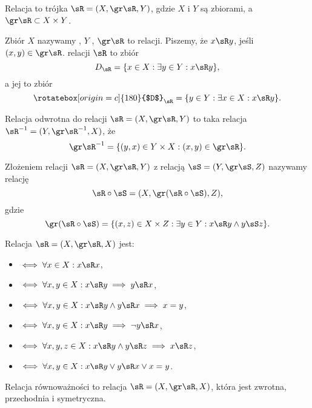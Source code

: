 \begin{definition}
    Relacja to trójka $\sR = (X, \gr\sR, Y)$, gdzie $X$ i $Y$ są zbiorami, a $\gr \sR \subset X \times Y$.
\end{definition}

Zbiór $X$ nazywamy , $Y$ , $\gr \sR$ to  relacji. Piszemy, że $x \sR y$, jeśli $(x, y) \in \gr\sR$.  relacji $\sR$ to zbiór
$$ D_\sR = \{x \in X : \exists y \in Y : x \sR y\}, $$
a jej  to zbiór
$$ \rotatebox[origin=c]{180}{$D$}_\sR = \{y \in Y : \exists x \in X : x \sR y\}. $$

\begin{definition}
    Relacja odwrotna do relacji $\sR = (X, \gr\sR, Y)$ to taka relacja $\sR^{-1} = (Y, \gr\sR^{-1}, X)$, że
    $$ \gr \sR^{-1} = \{(y, x) \in Y \times X : (x, y) \in \gr\sR\}. $$
\end{definition}

\begin{definition}
    Złożeniem relacji $\sR = (X, \gr\sR, Y)$ z relacją $\sS = (Y, \gr\sS, Z)$ nazywamy relację
    $$ \sR \circ \sS = (X, \gr(\sR \circ \sS), Z), $$
    gdzie
    $$ \gr(\sR \circ \sS) = \{(x, z) \in X \times Z : \exists y \in Y : x \sR y \wedge y \sS z\}. $$
\end{definition}

\begin{definition}
    Relacja $\sR = (X, \gr\sR, X)$ jest:
    \begin{itemize}[--]
        \item {} $\iff \forall x\in X : x \sR x$,
        \item {} $\iff \forall x, y \in X : x \sR y \implies y \sR x$,
        \item {} $\iff \forall x, y \in X : x \sR y \wedge y \sR x \implies x = y$,
        \item {} $\iff \forall x, y \in X : x \sR y \implies \neg y \sR x$,
        \item {} $\iff \forall x, y, z \in X : x \sR y \wedge y \sR z \implies x \sR z$,
        \item {} $\iff \forall x, y \in X : x \sR y \vee y \sR x \vee x = y$.
    \end{itemize}
\end{definition}

\begin{definition}
    Relacja równoważności to relacja $\sR = (X, \gr\sR, X)$, która jest zwrotna, przechodnia i symetryczna.
\end{definition}

